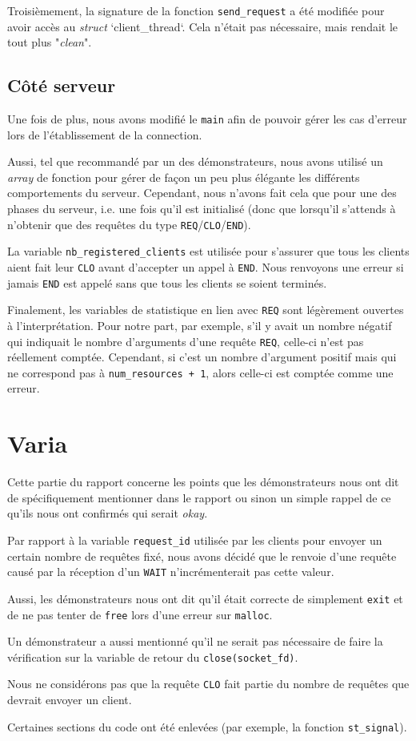 \documentclass[11pt]{article}
\begin{document}
Troisièmement, la signature de la fonction \texttt{send\_request} a été modifiée pour avoir accès au \textit{struct} `client\_thread`. Cela n'était pas nécessaire, mais rendait le tout plus "\textit{clean}".


\subsection{Côté serveur}

Une fois de plus, nous avons modifié le \texttt{main} afin de pouvoir gérer les cas d'erreur lors de l'établissement de la connection.

Aussi, tel que recommandé par un des démonstrateurs, nous avons utilisé un \textit{array} de fonction pour gérer de façon un peu plus élégante les différents comportements du serveur. Cependant, nous n'avons fait cela que pour une des phases du serveur, i.e. une fois qu'il est initialisé (donc que lorsqu'il s'attends à n'obtenir que des requêtes du type \texttt{REQ}/\texttt{CLO}/\texttt{END}).

La variable \texttt{nb\_registered\_clients} est utilisée pour s'assurer que tous les clients aient fait leur \texttt{CLO} avant d'accepter un appel à \texttt{END}. Nous renvoyons une erreur si jamais \texttt{END} est appelé sans que tous les clients se soient terminés.

Finalement, les variables de statistique en lien avec \texttt{REQ} sont légèrement ouvertes à l'interprétation. Pour notre part, par exemple, s'il y avait un nombre négatif qui indiquait le nombre d'arguments d'une requête \texttt{REQ}, celle-ci n'est pas réellement comptée. Cependant, si c'est un nombre d'argument positif mais qui ne correspond pas à \texttt{num\_resources + 1}, alors celle-ci est comptée comme une erreur.


\section{Varia}

Cette partie du rapport concerne les points que les démonstrateurs nous ont dit de spécifiquement mentionner dans le rapport ou sinon un simple rappel de ce qu'ils nous ont confirmés qui serait \textit{okay}.

Par rapport à la variable \texttt{request\_id} utilisée par les clients pour envoyer un certain nombre de requêtes fixé, nous avons décidé que le renvoie d'une requête causé par la réception d'un \texttt{WAIT} n'incrémenterait pas cette valeur.

Aussi, les démonstrateurs nous ont dit qu'il était correcte de simplement \texttt{exit} et de ne pas tenter de \texttt{free} lors d'une erreur sur \texttt{malloc}.

Un démonstrateur a aussi mentionné qu'il ne serait pas nécessaire de faire la vérification sur la variable de retour du \texttt{close(socket\_fd)}.

Nous ne considérons pas que la requête \texttt{CLO} fait partie du nombre de requêtes que devrait envoyer un client.

Certaines sections du code ont été enlevées (par exemple, la fonction \texttt{st\_signal}).
\end{document}
